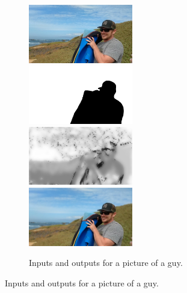 \documentclass{article}
\begin{document}
\begin{figure}
    \begin{subfigure}{\textwidth}
        \includegraphics[width=0.5\textwidth]{../data/dude-left}
        \includegraphics[width=0.5\textwidth]{../data/dude-seg-clean}
        \includegraphics[width=0.5\textwidth]{../output/dude-depth}
        \includegraphics[width=0.5\textwidth]{../output/dude-portrait}
        \caption{Inputs and outputs for a picture of a guy.}
    \end{subfigure}


\end{figure}
\end{document}
